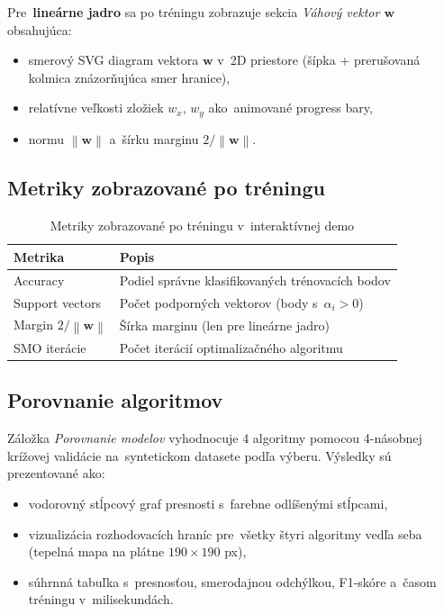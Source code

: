 \documentclass[12pt,a4paper]{article}
\newcommand{\norm}[1]{\left\lVert#1\right\rVert}
\begin{document}
Pre~\textbf{lineárne jadro} sa po tréningu zobrazuje sekcia
\emph{Váhový vektor $\mathbf{w}$} obsahujúca:
\begin{itemize}
  \item smerový SVG diagram vektora $\mathbf{w}$ v~2D priestore
    (šípka + prerušovaná kolmica znázorňujúca smer hranice),
  \item relatívne veľkosti zložiek $w_x$, $w_y$ ako~animované
    progress bary,
  \item normu $\norm{\mathbf{w}}$ a~šírku marginu $2/\norm{\mathbf{w}}$.
\end{itemize}

\subsection{Metriky zobrazované po tréningu}

\begin{table}[H]
  \centering
  \caption{Metriky zobrazované po tréningu v~interaktívnej demo}
  \begin{tabular}{ll}
    \toprule
    \textbf{Metrika} & \textbf{Popis} \\
    \midrule
    Accuracy
      & Podiel správne klasifikovaných trénovacích bodov \\
    Support vectors
      & Počet podporných vektorov (body s~$\alpha_i > 0$) \\
    Margin $2/\norm{\mathbf{w}}$
      & Šírka marginu (len pre lineárne jadro) \\
    SMO iterácie
      & Počet iterácií optimalizačného algoritmu \\
    \bottomrule
  \end{tabular}
\end{table}

\subsection{Porovnanie algoritmov}

Záložka \emph{Porovnanie modelov} vyhodnocuje 4 algoritmy pomocou
4-násobnej krížovej validácie na~syntetickom datasete podľa výberu.
Výsledky sú prezentované ako:
\begin{itemize}
  \item vodorovný stĺpcový graf presnosti s~farebne odlíšenými stĺpcami,
  \item vizualizácia rozhodovacích hraníc pre~všetky štyri algoritmy
    vedľa seba (tepelná mapa na plátne $190 \times 190$ px),
  \item súhrnná tabuľka s~presnosťou, smerodajnou odchýlkou, F1-skóre
    a~časom tréningu v~milisekundách.
\end{itemize}
\end{document}
